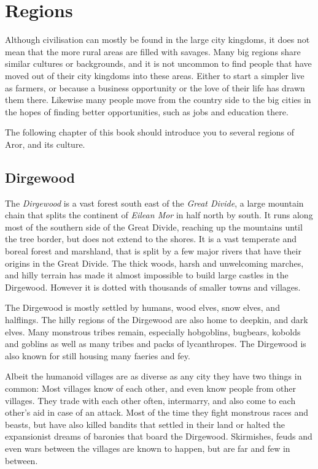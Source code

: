 \section{Regions}

Although civilisation can mostly be found in the large city kingdoms, it does
not mean that the more rural areas are filled with savages. Many big regions
share similar cultures or backgrounds, and it is not uncommon to find people
that have moved out of their city kingdoms into these areas. Either to start a
simpler live as farmers, or because a business opportunity or the love of
their life has drawn them there.  Likewise many people move from the country
side to the big cities in the hopes of finding better opportunities, such as
jobs and education there.

The following chapter of this book should introduce you to several regions of
Aror, and its culture.

\subsection{Dirgewood}

The \emph{Dirgewood} is a vast forest south east of the \emph{Great Divide}, a
large mountain chain that splits the continent of \emph{Eilean Mor} in half
north by south. It runs along most of the southern side of the Great Divide,
reaching up the mountains until the tree border, but does not extend to the
shores. It is a vast temperate and boreal forest and marshland, that is split
by a few major rivers that have their origins in the Great Divide. The thick
woods, harsh and unwelcoming marches, and hilly terrain has made it almost
impossible to build large castles in the Dirgewood. However it is dotted with
thousands of smaller towns and villages.

The Dirgewood is mostly settled by humans, wood elves, snow elves, and
halflings. The hilly regions of the Dirgewood are also home to deepkin, and
dark elves. Many monstrous tribes remain, especially hobgoblins, bugbears,
kobolds and goblins as well as many tribes and packs of lycanthropes. The
Dirgewood is also known for still housing many faeries and fey.

Albeit the humanoid villages are as diverse as any city they have two things
in common: Most villages know of each other, and even know people from other
villages. They trade with each other often, intermarry, and also come to each
other's aid in case of an attack. Most of the time they fight monstrous races
and beasts, but have also killed bandits that settled in their land or halted
the expansionist dreams of baronies that board the Dirgewood. Skirmishes,
feuds and even wars between the villages are known to happen, but are far and
few in between.


